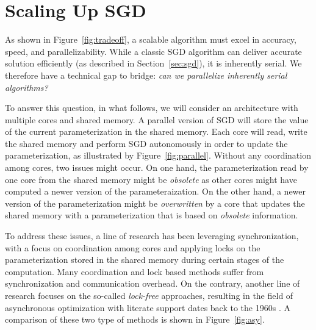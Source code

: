\documentclass[12pt]{report}
\begin{document}
\section{Scaling Up SGD}
As shown in Figure~\ref{fig:tradeoff}, a scalable algorithm must excel in accuracy, speed, and parallelizability. While a classic SGD algorithm can deliver accurate solution efficiently (as described in Section~\ref{sec:sgd}), it is inherently serial. We therefore have a technical gap to bridge: \emph{can we parallelize inherently serial algorithms?}

To answer this question, in what follows, we will consider an architecture with multiple cores and shared memory. A parallel version of SGD will store the value of the current parameterization in the shared memory. Each core will read, write the shared memory and perform SGD autonomously in order to update the parameterization, as illustrated by Figure~\ref{fig:parallel}.  Without any coordination among cores, two issues might occur. On one hand, the parameterization read by one core from the shared memory might be \emph{obsolete} as other cores might have computed a newer version of the parameteraization.  On the other hand, a newer version of the parameterization might be \emph{overwritten} by a core that updates the shared memory with a parameterization that is based on \emph{obsolete} information.

To address these issues, a line of research has been leveraging synchronization, with a focus on coordination among cores and applying locks on the parameterization stored in the shared memory during certain stages of the computation. Many coordination and lock based methods suffer from synchronization and communication overhead.  On the contrary, another line of research focuses on the so-called \emph{lock-free} approaches, resulting in the field of asynchronous optimization with literate support dates back to the 1960s \citep{zinkevich2010parallelized, zinkevich2009slow, bertsekas1989convergence, tsitsiklis1986distributed, chazan1969chaotic}. A comparison of these two type of methods is shown in Figure~\ref{fig:asy}.
\end{document}
